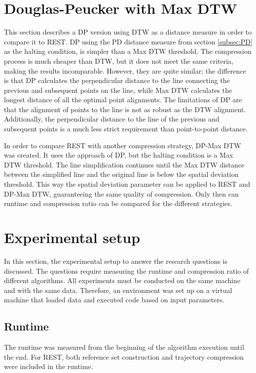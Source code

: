 \section{Douglas-Peucker with Max DTW}
This section describes a DP version using DTW as a distance measure in order to compare it to REST. DP using the PD distance measure from section \ref{subsec:PD} as the halting condition, is simpler than a Max DTW threshold. The compression process is much cheaper than DTW, but it does not meet the same criteria, making the results incomparable. However, they are quite similar; the difference is that DP calculates the perpendicular distance to the line connecting the previous and subsequent points on the line, while Max DTW calculates the longest distance of all the optimal point alignments. The limitations of DP are that the alignment of points to the line is not as robust as the DTW alignment. Additionally, the perpendicular distance to the line of the previous and subsequent points is a much less strict requirement than point-to-point distance.

In order to compare REST with another compression strategy, DP-Max DTW was created. It uses the approach of DP, but the halting condition is a Max DTW threshold. The line simplification continues until the Max DTW distance between the simplified line and the original line is below the spatial deviation threshold. This way the spatial deviation parameter can be applied to REST and DP-Max DTW, guaranteeing the same quality of compression. Only then can runtime and compression ratio can be compared for the different strategies.

\section{Experimental setup}
In this section, the experimental setup to answer the research questions is discussed. The questions require measuring the runtime and compression ratio of different algorithms. All experiments must be conducted on the same machine and with the same data. Therefore, an environment was set up on a virtual machine that loaded data and executed code based on input parameters.

\subsection{Runtime}
The runtime was measured from the beginning of the algorithm execution until the end. For REST, both reference set construction and trajectory compression were included in the runtime.
